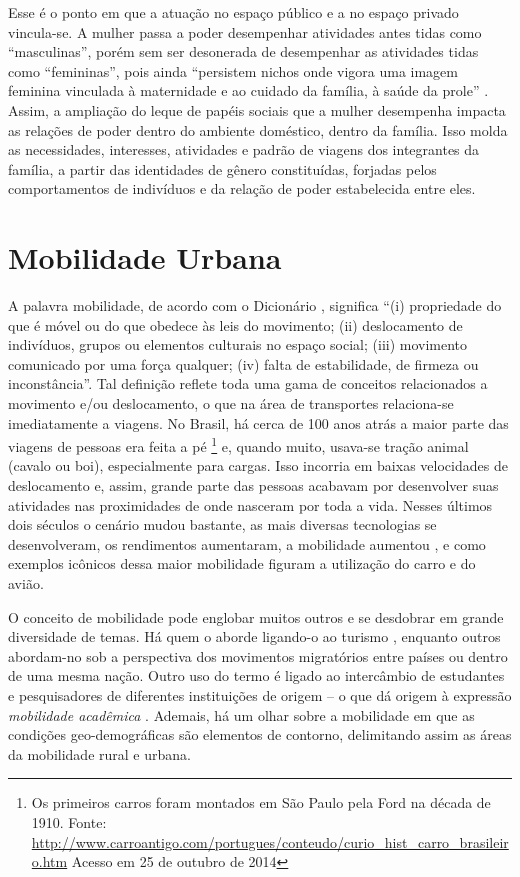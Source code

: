 Esse é o ponto em que a atuação no espaço público e a no espaço privado vincula-se.
A mulher passa a poder desempenhar atividades antes tidas como ``masculinas'', porém sem ser desonerada de desempenhar as atividades tidas como ``femininas'', pois  ainda ``persistem nichos onde vigora uma imagem feminina vinculada à maternidade e ao cuidado da família, à saúde da prole'' \cite[p.94]{BLAY2001}. 
Assim, a ampliação do leque de papéis sociais que a mulher desempenha impacta as relações de poder dentro do ambiente doméstico, dentro da família. Isso molda as necessidades, interesses, atividades e padrão de viagens dos integrantes da família, a partir das identidades de gênero constituídas, forjadas pelos comportamentos de indivíduos e da relação de poder estabelecida entre eles.

\clearpage
\section{Mobilidade Urbana}

A palavra mobilidade, de acordo com o Dicionário ,
significa ``(i) propriedade do que é móvel ou do que obedece às leis do movimento;
(ii) deslocamento de indivíduos, grupos ou elementos culturais no espaço social;
(iii) movimento comunicado por uma força qualquer;
(iv) falta de estabilidade, de firmeza ou inconstância''.
Tal definição reflete toda uma gama de conceitos relacionados a movimento e/ou deslocamento, o que na área de transportes relaciona-se imediatamente a viagens.
No Brasil, há cerca de 100 anos atrás a maior parte das viagens de pessoas era feita a pé
\footnote{Os primeiros carros foram montados em São Paulo pela Ford na década de 1910. Fonte: \url{http://www.carroantigo.com/portugues/conteudo/curio_hist_carro_brasileiro.htm} Acesso em 25 de outubro de 2014} 
e, quando muito, usava-se tração animal (cavalo ou boi), especialmente para cargas. Isso incorria em baixas velocidades de deslocamento e, assim, grande parte das pessoas acabavam por desenvolver suas atividades nas proximidades de onde nasceram por toda a vida. Nesses últimos dois séculos o cenário mudou bastante, as mais diversas tecnologias se desenvolveram, os rendimentos aumentaram, a mobilidade aumentou \cite[p.06]{METZ2012}, e como exemplos icônicos dessa maior mobilidade figuram a utilização do carro e do avião.

O conceito de mobilidade pode englobar muitos outros e se desdobrar em grande diversidade de temas.
Há quem o aborde ligando-o ao turismo \cite{ENLOE1989,FROHLICK2008}, enquanto outros \cite{CHANT1992,SILVEY2000} abordam-no sob a perspectiva dos movimentos migratórios entre países ou dentro de uma mesma nação. Outro uso do termo é ligado ao intercâmbio de estudantes e pesquisadores de diferentes instituições de origem – o que dá origem à expressão \emph{mobilidade acadêmica} \cite{ENDERS1998,TREMBLAY2005,HOFFMAN2008} . Ademais, há um olhar sobre a mobilidade em que as condições geo-demográficas são elementos de contorno, delimitando assim as áreas da mobilidade rural e urbana.
 
